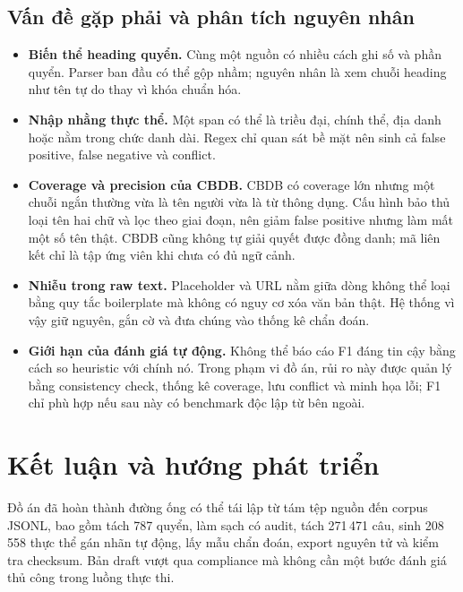 \documentclass[11pt,a4paper]{article}
\begin{document}
\subsection{Vấn đề gặp phải và phân tích nguyên nhân}

\begin{itemize}
  \item \textbf{Biến thể heading quyển.} Cùng một nguồn có nhiều cách ghi số và
  phần quyển. Parser ban đầu có thể gộp nhầm; nguyên nhân là xem chuỗi heading
  như tên tự do thay vì khóa chuẩn hóa.

  \item \textbf{Nhập nhằng thực thể.} Một span có thể là triều đại, chính thể,
  địa danh hoặc nằm trong chức danh dài. Regex chỉ quan sát bề mặt nên sinh cả
  false positive, false negative và conflict.

  \item \textbf{Coverage và precision của CBDB.} CBDB có coverage lớn nhưng một
  chuỗi ngắn thường vừa là tên người vừa là từ thông dụng. Cấu hình bảo thủ loại
  tên hai chữ và lọc theo giai đoạn, nên giảm false positive nhưng làm mất một
  số tên thật. CBDB cũng không tự giải quyết được đồng danh; mã liên kết chỉ là
  tập ứng viên khi chưa có đủ ngữ cảnh.

  \item \textbf{Nhiễu trong raw text.} Placeholder và URL nằm giữa dòng không thể
  loại bằng quy tắc boilerplate mà không có nguy cơ xóa văn bản thật. Hệ thống vì vậy
  giữ nguyên, gắn cờ và đưa chúng vào thống kê chẩn đoán.

  \item \textbf{Giới hạn của đánh giá tự động.} Không thể báo cáo F1 đáng tin cậy
  bằng cách so heuristic với chính nó. Trong phạm vi đồ án, rủi ro này được quản
  lý bằng consistency check, thống kê coverage, lưu conflict và minh họa lỗi;
  F1 chỉ phù hợp nếu sau này có benchmark độc lập từ bên ngoài.
\end{itemize}

\section{Kết luận và hướng phát triển}

Đồ án đã hoàn thành đường ống có thể tái lập từ tám tệp nguồn đến corpus JSONL,
bao gồm tách 787 quyển, làm sạch có audit, tách 271\,471 câu, sinh 208\,558 thực
thể gán nhãn tự động, lấy mẫu chẩn đoán, export nguyên tử và kiểm tra checksum.
Bản draft vượt qua compliance mà không cần một bước đánh giá thủ công trong
luồng thực thi.
\end{document}
